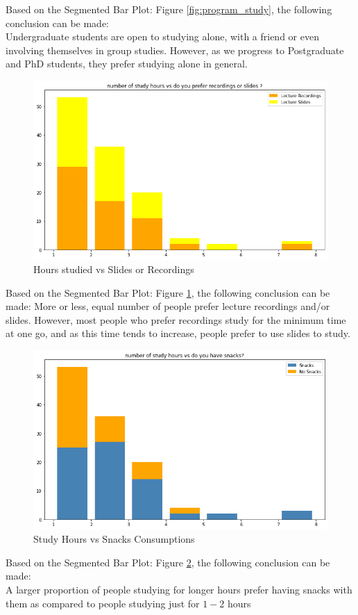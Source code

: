 \documentclass[12pt,onecolumn,letterpaper]{article}
\begin{document}
\hspace{0.3in} Based on the Segmented Bar Plot: Figure \ref{fig:program_study}, the following conclusion can be made:\\
Undergraduate students are open to studying alone, with a friend or even involving themselves in group studies. However, as we progress to Postgraduate and PhD students, they prefer studying alone in general.
\begin{figure}[h]
    \centering
    \includegraphics[scale=0.5]{output5.png}
    \caption{Hours studied vs Slides or Recordings}
    \label{fig:hour_slides}
\end{figure}

\hspace{0.3in} Based on the Segmented Bar Plot: Figure \ref{fig:hour_slides}, the following conclusion can be made:
More or less, equal number of people prefer lecture recordings and/or slides. However, most people who prefer recordings study for the minimum time at one go,
 and as this time tends to increase, people prefer to use slides to study.

\begin{figure}[h]
    \centering
    \includegraphics[scale=0.5]{snackstudytime.png}
    \caption{Study Hours vs Snacks Consumptions}
    \label{fig:hour_snack}
\end{figure}
\hspace{0.3in} Based on the Segmented Bar Plot: Figure \ref{fig:hour_snack}, the following conclusion can be made:\\
A larger proportion of people studying for longer hours prefer having snacks with them as compared to people studying just for $1-2$ hours 
\end{document}
